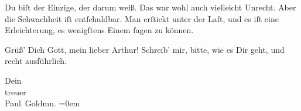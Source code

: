 \pstart
           Du biſt der Einzige, der darum weiß. Das war wohl auch vielleicht Unrecht. Aber die
               Schwachheit iſt entſchuldbar. Man erſtickt unter der Laſt, und es iſt eine
               Erleichterung, es wenigſtens Einem{ }ſagen zu können.\pend
           
\pstart
           Grüß’ Dich Gott, mein lieber Arthur! Schreib’ mir, bitte, wie es Dir geht, und recht
               ausführlich.\pend
           
\pstart
           Dein {\\[\baselineskip]}treuer {\\[\baselineskip]}\spacefill\mbox{Paul Goldmn.}\pend
           \leftskip=0em{}\endnumbering{}  \newcommand{\dateiname}{L02705}\newcommand{\titel}{Paul Goldmann an Arthur Schnitzler, 25. 2. [1893]}\newcommand{\editorInnen}{Martin Anton Müller und Laura Untner}
